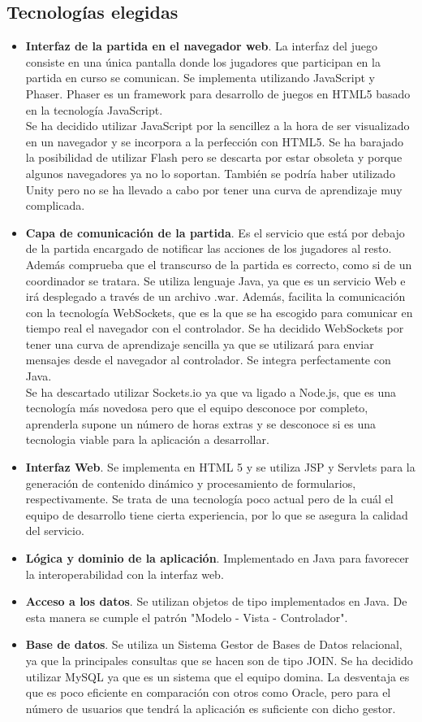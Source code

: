 \subsection{Tecnologías elegidas}
\begin{itemize}
\item \textbf{Interfaz de la partida en el navegador web}. La interfaz del juego consiste en una única pantalla donde los jugadores que participan en la partida en curso se comunican. Se implementa utilizando JavaScript y Phaser. Phaser es un framework para desarrollo de juegos en HTML5 basado en la tecnología JavaScript.  \\ Se ha decidido utilizar JavaScript por la sencillez a la hora de ser visualizado en un navegador y se incorpora a la perfección con HTML5. Se ha barajado la posibilidad de utilizar Flash pero se descarta por estar obsoleta y porque algunos navegadores ya no lo soportan. También se podría haber utilizado Unity pero no se ha llevado a cabo por tener una curva de aprendizaje muy complicada.
\item \textbf{Capa de comunicación de la partida}. Es el servicio que está por debajo de la partida encargado de notificar las acciones de los jugadores al resto. Además comprueba que el transcurso de la partida es correcto, como si de un coordinador se tratara. Se utiliza lenguaje Java, ya que es un servicio Web e irá desplegado a través de un archivo .war. Además, facilita la comunicación con la tecnología WebSockets, que es la que se ha escogido para comunicar en tiempo real el navegador con el controlador. Se ha decidido WebSockets por tener una curva de aprendizaje sencilla ya que se utilizará para enviar mensajes desde el navegador al controlador. Se integra perfectamente con Java. \\
Se ha descartado utilizar Sockets.io ya que va ligado a Node.js, que es una tecnología más novedosa pero que el equipo desconoce por completo, aprenderla supone un número de horas extras y se desconoce si es una tecnologia viable para la aplicación a desarrollar.
\item \textbf{Interfaz Web}. Se implementa en HTML 5 y se utiliza  JSP y Servlets para la generación de contenido dinámico y procesamiento de formularios, respectivamente. Se trata de una tecnología poco actual pero de la cuál el equipo de desarrollo tiene cierta experiencia, por lo que se asegura la calidad del servicio.
\item \textbf{Lógica y dominio de la aplicación}. Implementado en Java para favorecer la interoperabilidad con la interfaz web.
\item \textbf{Acceso a los datos}. Se utilizan objetos de tipo implementados en Java. De esta manera se cumple el patrón "Modelo - Vista - Controlador".
\item \textbf{Base de datos}. Se utiliza un Sistema Gestor de Bases de Datos relacional, ya que la principales consultas que se hacen son de tipo JOIN. Se ha decidido utilizar MySQL ya que es un sistema que el equipo domina. La desventaja es que es poco eficiente en comparación con otros como Oracle, pero para el número de usuarios que tendrá la aplicación es suficiente con dicho gestor.
\end{itemize}



